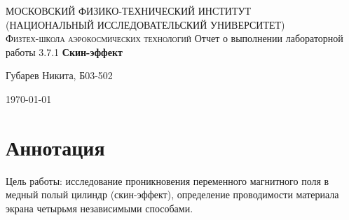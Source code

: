\documentclass[a4paper,12pt]{article}
\begin{document}
\begin{titlepage}
    \centering
    {\scshape\Large МОСКОВСКИЙ ФИЗИКО-ТЕХНИЧЕСКИЙ ИНСТИТУТ \\
    (НАЦИОНАЛЬНЫЙ ИССЛЕДОВАТЕЛЬСКИЙ УНИВЕРСИТЕТ)\\
    Физтех-школа аэрокосмических технологий}
    \vspace{4cm}
    {\LARGE Отчет о выполнении лабораторной работы 3.7.1}
    \vspace{1cm}
    {\huge\bf Скин-эффект}
    \vfill
    \begin{flushright}
        {\LARGE Губарев Никита, Б03-502}
    \end{flushright}
    \vfill
    \today
\end{titlepage}

\tableofcontents
\newpage

\section{Аннотация}
Цель работы: исследование проникновения переменного магнитного поля в медный полый цилиндр (скин-эффект), определение проводимости материала экрана четырьмя независимыми способами.
\end{document}

